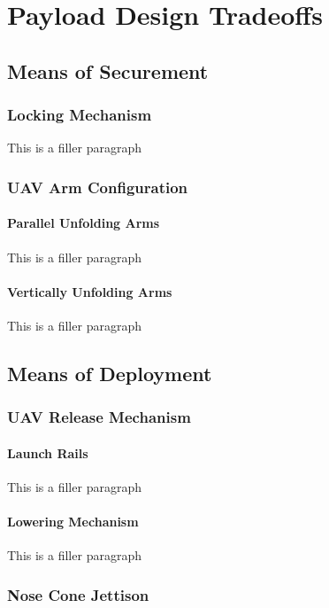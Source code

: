 \chapter{Payload Design Tradeoffs}

\section{Means of Securement}\label{PL:Deployment:Securement}
	\subsection{Locking Mechanism}
		This is a filler paragraph
		
	\subsection{UAV Arm Configuration}
		\subsubsection{Parallel Unfolding Arms}
			This is a filler paragraph

		\subsubsection{Vertically Unfolding Arms}
			This is a filler paragraph

\section{Means of Deployment}\label{PL:Deployment:Deployment}
	\subsection{UAV Release Mechanism}
		\subsubsection{Launch Rails}
			This is a filler paragraph

		\subsubsection{Lowering Mechanism}
			This is a filler paragraph

	\subsection{Nose Cone Jettison}
